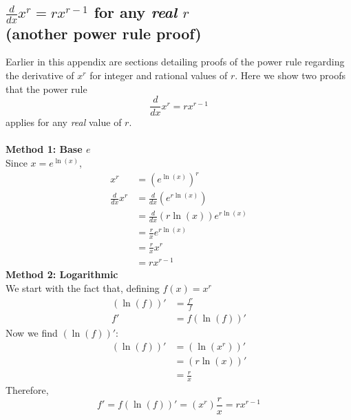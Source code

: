 \documentclass{report}
\begin{document}
\subsection{$\frac{d}{dx}x^r=rx^{r-1}$ for any \textit{real} $r$\\ (another power rule proof)}
Earlier in this appendix are sections detailing proofs of the power rule regarding the derivative
of $x^r$ for integer and rational values of $r$. Here we show two proofs that the power rule
\begin{equation*}
\frac{d}{dx}x^r=rx^{r-1}
\end{equation*}
applies for any \textit{real} value of $r$.\\
\vspace{1mm}\\
\textbf{Method 1: Base $e$}\\
Since $x=e^{\ln(x)}$,
\begin{align*}
x^r&=(e^{\ln(x)})^r\\
\frac{d}{dx}x^r&=\frac{d}{dx}(e^{r\ln(x)})\\
&=\frac{d}{dx}(r\ln(x))e^{r\ln(x)}\\
&=\frac{r}{x}e^{r\ln(x)}\\
&=\frac{r}{x}x^r\\
&=rx^{r-1}
\end{align*}
\textbf{Method 2: Logarithmic}\\
We start with the fact that, defining $f(x)=x^r$
\begin{align*}
(\ln(f))'&=\frac{f'}{f}\\
f'&=f(\ln(f))'
\end{align*}
Now we find $(\ln(f))'$:
\begin{align*}
(\ln(f))'&=(\ln(x^r))'\\
&=(r\ln(x))'\\
&=\frac{r}{x}
\end{align*}
Therefore,
\begin{equation*}
f'=f(\ln(f))'=(x^r)\frac{r}{x}=rx^{r-1}
\end{equation*}
\newpage
\end{document}
